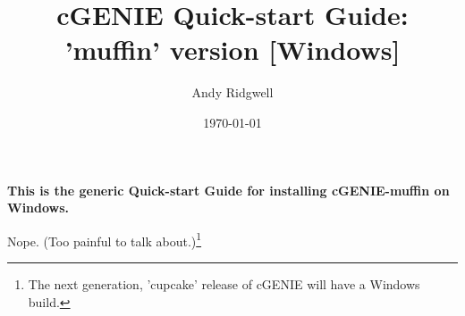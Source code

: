 \documentclass[10pt,twoside]{article}
\title{cGENIE Quick-start Guide: 'muffin' version [Windows]}
\author{Andy Ridgwell}
\date{\today}
\begin{document}

\maketitle


\noindent \textbf{This is the generic Quick-start Guide for installing cGENIE-muffin on Windows.}

\noindent Nope. (Too painful to talk about.)\footnote{The next generation, 'cupcake' release of cGENIE will have a Windows build.}

\end{document}
